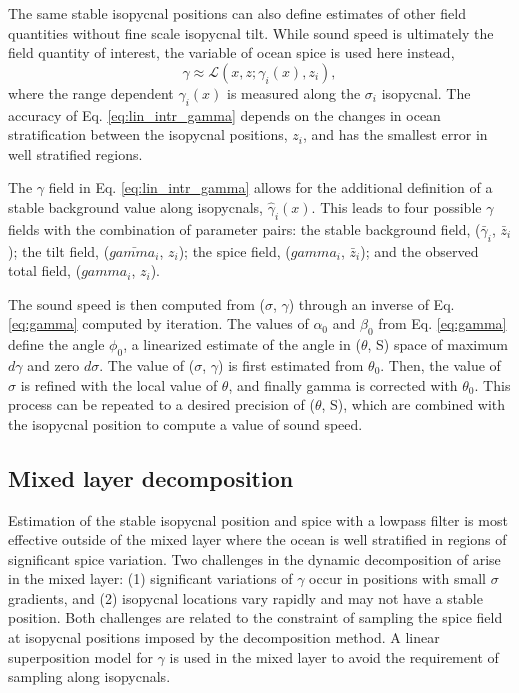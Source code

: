 \documentclass[preprint,NumberedRefs]{JASA}
\begin{document}
The same stable isopycnal positions can also define estimates of other field quantities without fine scale isopycnal tilt. While sound speed is ultimately the field quantity of interest, the variable of ocean spice is used here instead,
\begin{equation}
    \gamma\approx\mathcal{L}(x, z; \gamma_i(x), z_i),
    \label{eq:lin_intr_gamma}
\end{equation}
where the range dependent $\gamma_i(x)$ is measured along the $\sigma_i$ isopycnal. The accuracy of Eq. \eqref{eq:lin_intr_gamma} depends on the changes in ocean stratification between the isopycnal positions, $z_i$, and has the smallest error in well stratified regions.

The $\gamma$ field in Eq. \eqref{eq:lin_intr_gamma} allows for the additional definition of a stable background value along isopycnals, $\hat{\gamma}_i(x)$. This leads to four possible $\gamma$ fields with the combination of parameter pairs: the stable background field, ($\bar{\gamma}_i$, $\bar{z}_i$); the tilt field, ($\bar{gamma_i}$, $z_i$); the spice field, ($gamma_i$, $\bar{z}_i$); and the observed total field, ($gamma_i$, $z_i$).

The sound speed is then computed from ($\sigma$, $\gamma$) through an inverse of Eq. \eqref{eq:gamma} computed by iteration. The values of $\alpha_0$ and $\beta_0$ from Eq. \eqref{eq:gamma} define the angle $\phi_0$, a linearized estimate of the angle in ($\theta$, S) space of maximum $d\gamma$ and zero $d\sigma$. The value of ($\sigma$, $\gamma$) is first estimated from $\theta_0$. Then, the value of $\sigma$ is refined with the local value of $\theta$, and finally gamma is corrected with $\theta_0$. This process can be repeated to a desired precision of ($\theta$, S), which are combined with the isopycnal position to compute a value of sound speed.


\subsection{Mixed layer decomposition}
Estimation of the stable isopycnal position and spice with a lowpass filter is most effective outside of the mixed layer where the ocean is well stratified in regions of significant spice variation. Two challenges in the dynamic decomposition of \citep{dzieciuch2004} arise in the mixed layer: (1) significant variations of $\gamma$ occur in positions with small $\sigma$ gradients, and (2) isopycnal locations vary rapidly and may not have a stable position. Both challenges are related to the constraint of sampling the spice field at isopycnal positions imposed by the decomposition method. A linear superposition model for $\gamma$ is used in the mixed layer to avoid the requirement of sampling along isopycnals.
\end{document}
